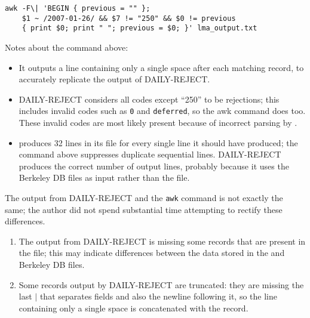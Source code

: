 
\begin{verbatim}
awk -F\| 'BEGIN { previous = "" };
    $1 ~ /2007-01-26/ && $7 != "250" && $0 != previous
    { print $0; print " "; previous = $0; }' lma_output.txt
\end{verbatim}

Notes about the command above:

\begin{itemize}

    \item It outputs a line containing only a single space after each
        matching record, to accurately replicate the output of
        DAILY-REJECT\@.

    \item DAILY-REJECT considers all  codes except ``250'' to
        be rejections; this includes invalid  codes such as
        \texttt{0} and \texttt{deferred}, so the awk command does too.
        These invalid  codes are most likely present because
        of incorrect parsing by .

    \item {} produces 32 lines in its  file for
        every single line it should have produced; the command above
        suppresses duplicate sequential lines.  DAILY-REJECT produces the
        correct number of output lines, probably because it uses the
        Berkeley DB files as input rather than the  file.

\end{itemize}

The output from DAILY-REJECT and the \texttt{awk} command is not exactly
the same; the author did not spend substantial time attempting to rectify
these differences.

\begin{enumerate}

    \item The output from DAILY-REJECT is missing some records that are
        present in the  file; this may indicate differences
        between the data stored in the  and Berkeley DB files.

    \item Some records output by DAILY-REJECT are truncated: they are
        missing the last $|$ that separates fields and also the newline
        following it, so the line containing only a single space is
        concatenated with the record.

\end{enumerate}

